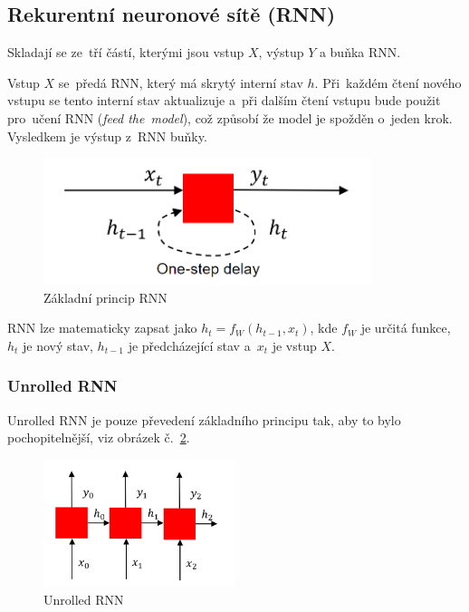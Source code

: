 \subsection{Rekurentní neuronové sítě (RNN)}

Skladají se ze~tří částí, kterými jsou vstup $X$, výstup $Y$ a buňka RNN.

Vstup $X$ se~předá RNN, který má skrytý interní stav $h$.
Při~každém čtení nového vstupu se tento interní stav aktualizuje a~při dalším čtení vstupu bude  použit pro~učení RNN (\emph{feed the~model}), což způsobí že model je spožděn o~jeden krok.
Vysledkem je výstup z~RNN buňky.

\begin{figure}[h]
    \centering
	\includegraphics[height=10em]{images/09_RNN.png}
    \caption{Základní princip RNN}
    \label{RNN}
\end{figure}

RNN lze matematicky zapsat jako $h_t = f_W(h_{t-1},x_t)$, kde $f_W$ je určitá funkce, $h_t$ je nový stav, $h_{t-1}$ je předcházející stav a~$x_t$ je vstup $X$.

\subsubsection{Unrolled RNN}

Unrolled RNN je pouze převedení základního principu tak, aby to bylo pochopitelnější, viz obrázek č.~\ref{unrolledRNN}.

\begin{figure}[h]
    \centering
	\includegraphics[height=10em]{images/09_unrolled-RNN.png}
    \caption{Unrolled RNN}
    \label{unrolledRNN}
\end{figure}

